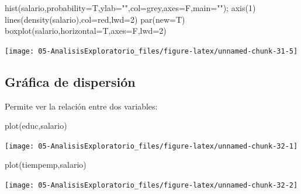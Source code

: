 \documentclass[
]{book}
\newenvironment{Shaded}{\begin{snugshade}}{\end{snugshade}}
\newcommand{\AttributeTok}[1]{\textcolor[rgb]{0.77,0.63,0.00}{#1}}
\newcommand{\DecValTok}[1]{\textcolor[rgb]{0.00,0.00,0.81}{#1}}
\newcommand{\FunctionTok}[1]{\textcolor[rgb]{0.00,0.00,0.00}{#1}}
\newcommand{\NormalTok}[1]{#1}
\newcommand{\StringTok}[1]{\textcolor[rgb]{0.31,0.60,0.02}{#1}}
\theoremstyle{break}
\begin{document}
\begin{Shaded}
\begin{Highlighting}[]
\FunctionTok{hist}\NormalTok{(salario,}\AttributeTok{probability=}\NormalTok{T,}\AttributeTok{ylab=}\StringTok{""}\NormalTok{,}\AttributeTok{col=}\StringTok{\textquotesingle{}grey\textquotesingle{}}\NormalTok{,}\AttributeTok{axes=}\NormalTok{F,}\AttributeTok{main=}\StringTok{""}\NormalTok{); }\FunctionTok{axis}\NormalTok{(}\DecValTok{1}\NormalTok{)}
\FunctionTok{lines}\NormalTok{(}\FunctionTok{density}\NormalTok{(salario),}\AttributeTok{col=}\StringTok{\textquotesingle{}red\textquotesingle{}}\NormalTok{,}\AttributeTok{lwd=}\DecValTok{2}\NormalTok{)}
\FunctionTok{par}\NormalTok{(}\AttributeTok{new=}\NormalTok{T)}
\FunctionTok{boxplot}\NormalTok{(salario,}\AttributeTok{horizontal=}\NormalTok{T,}\AttributeTok{axes=}\NormalTok{F,}\AttributeTok{lwd=}\DecValTok{2}\NormalTok{)}
\end{Highlighting}
\end{Shaded}

\begin{center}\texttt{[image: 05-AnalisisExploratorio\_files/figure-latex/unnamed-chunk-31-5]} \end{center}

\hypertarget{gruxe1fica-de-dispersiuxf3n}{%
\subsection{Gráfica de dispersión}\label{gruxe1fica-de-dispersiuxf3n}}

Permite ver la relación entre dos variables:

\begin{Shaded}
\begin{Highlighting}[]
\FunctionTok{plot}\NormalTok{(educ,salario)}
\end{Highlighting}
\end{Shaded}

\begin{center}\texttt{[image: 05-AnalisisExploratorio\_files/figure-latex/unnamed-chunk-32-1]} \end{center}

\begin{Shaded}
\begin{Highlighting}[]
\FunctionTok{plot}\NormalTok{(tiempemp,salario)}
\end{Highlighting}
\end{Shaded}

\begin{center}\texttt{[image: 05-AnalisisExploratorio\_files/figure-latex/unnamed-chunk-32-2]} \end{center}
\end{document}
